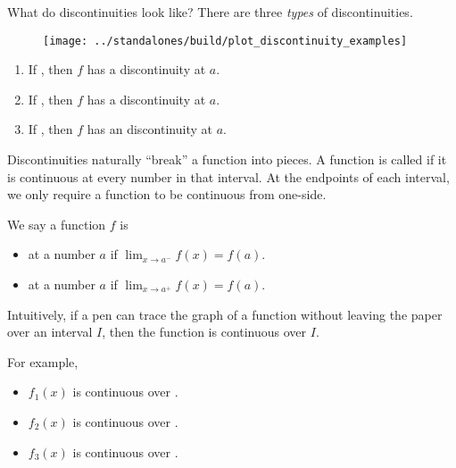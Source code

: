 \documentclass[../main.tex]{subfiles}
\begin{document}
  What do discontinuities look like? There are three \emph{types} of discontinuities.

  \begin{figure}[h]  %
    \centering
    \texttt{[image: ../standalones/build/plot\_discontinuity\_examples]}
    \label{fig:discontinuities}
  \end{figure}

  \begin{enumerate}[itemsep={3ex}]
    \item If \underline{\hspace{3in}}, then \(f\) has a  discontinuity at \(a\).
    \item If \underline{\hspace{3in}}, then \(f\) has a  discontinuity at \(a\).
    \item If \underline{\hspace{3in}}, then \(f\) has an  discontinuity at \(a\).
  \end{enumerate}

  Discontinuities naturally ``break'' a function into pieces.
  A function is called  if it is continuous at every number in that interval. At the endpoints of each interval, we only require a function to be continuous from one-side.

  We say a function \(f\) is 
  \begin{itemize}
    \item {} at a number \(a\) if \(\lim_{{x \to a^{-}}} f(x) = f(a)\).
    \item {} at a number \(a\) if \(\lim_{{x \to a^{+}}} f(x) = f(a)\).
  \end{itemize}

  Intuitively, if a pen can trace the graph of a function without leaving the paper over an interval \(I\), then the function is continuous over \(I\).

  For example, 
  \begin{itemize}[itemsep={3ex}]
    \item \(f_{1}(x)\) is continuous over \underline{\hspace{2in}}.
    \item \(f_{2}(x)\) is continuous over \underline{\hspace{2in}}.
    \item \(f_{3}(x)\) is continuous over \underline{\hspace{2in}}.
  \end{itemize}
  \vfill{}
  \clearpage
\end{document}
